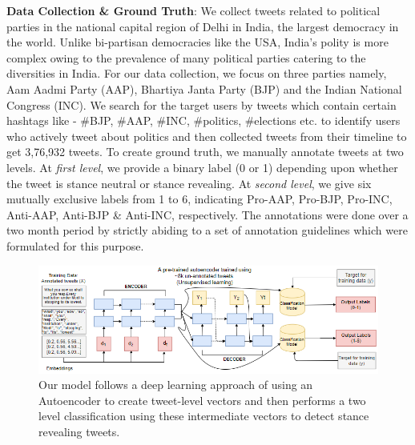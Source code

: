 \documentclass[a4paper,12pt]{article}
\begin{document}
\textbf{Data Collection \& Ground Truth}:
We collect tweets related to political parties in the national capital region of Delhi in India, the largest democracy in the world.
Unlike bi-partisan democracies like the USA, India's polity is more complex owing to the prevalence of many political parties catering to the diversities in India. 
For our data collection, we focus on three parties namely, Aam Aadmi Party (AAP), Bhartiya Janta Party (BJP) and the Indian National Congress (INC).
We search for the target users by tweets which contain certain hashtags like - \#BJP, \#AAP, \#INC, \#politics, \#elections  etc. to identify users who actively tweet about politics and then collected tweets from their timeline to get 3,76,932 tweets. To create ground truth, we manually annotate tweets at two levels. At \textit{first level}, we provide a binary label (0 or 1) depending upon whether the tweet is stance neutral or stance revealing. 
At \textit{second level}, we give six mutually exclusive labels from 1 to 6, indicating Pro-AAP, Pro-BJP, Pro-INC, Anti-AAP, Anti-BJP \& Anti-INC, respectively. 
The annotations were done over a two month period by strictly abiding to a set of annotation guidelines which were formulated for this purpose.

\begin{figure}[h]
\centering
\includegraphics[width=15cm]{IC2S2_Latex_template/images/final5.png}
\caption{%
Our model follows a deep learning approach of using an Autoencoder to create tweet-level vectors and then performs a two level classification using these intermediate vectors to detect stance revealing tweets.}
\label{fig:image}
\end{figure}
\end{document}
